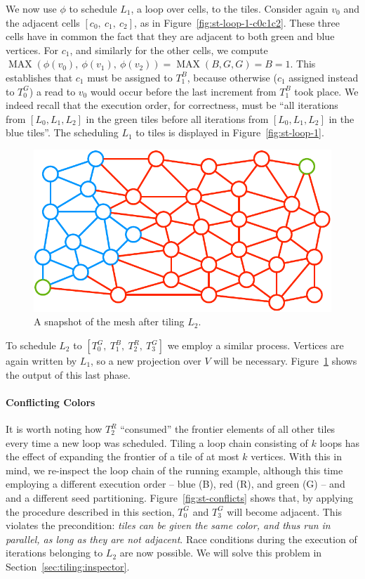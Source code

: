 We now use $\phi$ to schedule $L_1$, a loop over cells, to the tiles. Consider again $v_0$ and the adjacent cells $[c_0,\ c_1,\ c_2]$, as in Figure~\ref{fig:st-loop-1-c0c1c2}. These three cells have in common the fact that they are adjacent to both green and blue vertices. For $c_1$, and similarly for the other cells, we compute $\operatorname{MAX}(\phi(v_0),\ \phi(v_1),\ \phi(v_2)) = \operatorname{MAX}(B, G, G) = B = 1$. This establishes that $c_1$ must be assigned to $T_1^B$, because otherwise ($c_1$ assigned instead to $T_0^G$) a read to $v_0$ would occur before the last increment from $T_1^B$ took place. We indeed recall that the execution order, for correctness, must be ``all iterations from $[L_0, L_1, L_2]$ in the green tiles before all iterations from $[L_0, L_1, L_2]$ in the blue tiles''. The scheduling $L_1$ to tiles is displayed in Figure~\ref{fig:st-loop-1}.

\begin{figure}[h]
\centering
\includegraphics[scale=0.6]{sparsetiling/figures/loop_2.pdf}
\caption{A snapshot of the mesh after tiling $L_2$.}
\label{fig:st-loop-2}
\end{figure}

To schedule $L_2$ to $[T_0^G,\ T_1^B,\ T_2^R,\ T_3^G]$ we employ a similar process. Vertices are again written by $L_1$, so a new projection over $V$ will be necessary. Figure~\ref{fig:st-loop-2} shows the output of this last phase. 



\paragraph{Conflicting Colors}
It is worth noting how $T_2^R$ ``consumed'' the frontier elements of all other tiles every time a new loop was scheduled. Tiling a loop chain consisting of $k$ loops has the effect of expanding the frontier of a tile of at most $k$ vertices. With this in mind, we re-inspect the loop chain of the running example, although this time employing a different execution order -- blue (B), red (R), and green (G) -- and and a different seed partitioning. Figure~\ref{fig:st-conflicts} shows that, by applying the procedure described in this section, $T_0^G$ and $T_3^G$ will become adjacent. This violates the precondition: {\it tiles can be given the same color, and thus run in parallel, as long as they are not adjacent}. Race conditions during the execution of iterations belonging to $L_2$ are now possible. We will solve this problem in Section~\ref{sec:tiling:inspector}.


